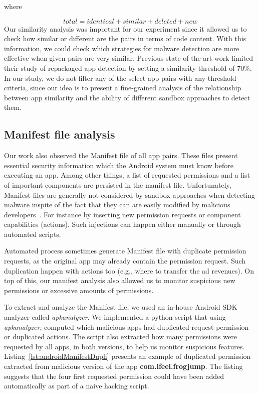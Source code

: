 where

\begin{equation}
 total = identical + similar + deleted + new\label{eq:2}
\end{equation}
\newline
Our similarity analysis was important for our experiment since it allowed us to check how similar or different are the pairs in terms of code content. With this information, we could check which strategies for malware detection are more effective when given pairs are very similar. Previous state of the art work \cite{DBLP:conf/codaspy/ZhouZJN12} limited their study of repackaged app detection by setting a similarity threshold of 70\%. In our study, we do not filter any of the select app pairs with any threshold criteria, since our idea is to present a fine-grained analysis of the relationship between app similarity and the ability of different sandbox approaches to detect them.

\subsection{Manifest file analysis}\label{sec:manifestAnalysis}

Our work also observed the Manifest file of all app pairs. These files present essential security information which the Android system must know before executing an app. Among other things, a  list of requested permissions and a list of important components are persisted in the manifest file. Unfortunately, Manifest files are generally not considered by sandbox approaches when detecting malware inspite of the fact that they can are easily modified by malicious developers~\cite{DBLP:journals/corr/abs-1208-4536}. For instance by inserting new permission requests or component capabilities (actions). Such injections can happen either manually or through automated scripts.

Automated process sometimes generate Manifest file with duplicate permission requests, as the original app may already contain the permission request. Such duplication happen with actions too (e.g., where to transfer the ad revenues). On top of this, our manifest analysis also allowed us to monitor suspicious new permissions or excessive amounts of permissions. 

To extract and analyze the Manifest file, we used an in-house Android SDK analyzer called \textit{apkanalyzer}. We implemented a python script that using \textit{apkanalyzer}, computed which malicious apps had duplicated request permission or duplicated actions. The script also extracted how many permissions were requested by all apps, in both versions, to help us monitor suspicious features. Listing~\ref{lst:androidManifestDupli} presents an example of duplicated permission extracted from malicious version of the app \textbf{com.ifeel.frogjump}. The listing suggests that the four first requested permission could have been added automatically as part of a naive hacking script.

